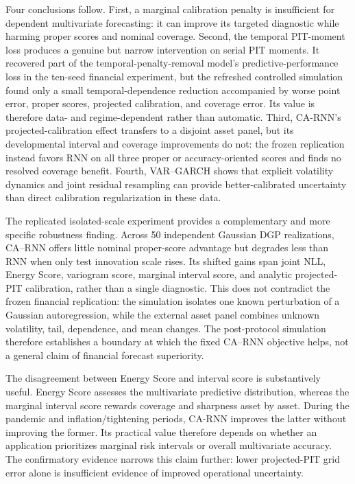 \documentclass[11pt]{article}
\begin{document}
Four conclusions follow. First, a marginal calibration penalty is insufficient
for dependent multivariate forecasting: it can improve its targeted diagnostic
while harming proper scores and nominal coverage. Second, the temporal PIT-moment
loss produces a genuine but narrow intervention on serial PIT moments. It
recovered part of the temporal-penalty-removal model's predictive-performance
loss in the ten-seed financial experiment, but the refreshed controlled
simulation found only a small temporal-dependence reduction accompanied by worse
point error, proper scores, projected calibration, and coverage error. Its value
is therefore data- and regime-dependent rather than automatic. Third, CA-RNN's projected-calibration
effect transfers to a disjoint asset panel, but its developmental interval and
coverage improvements do not: the frozen replication instead favors RNN on all
three proper or accuracy-oriented scores and finds no resolved coverage benefit.
Fourth, VAR--GARCH shows that explicit volatility dynamics and joint residual
resampling can provide better-calibrated uncertainty than direct calibration
regularization in these data.

The replicated isolated-scale experiment provides a complementary and more
specific robustness finding. Across 50 independent Gaussian DGP realizations,
CA--RNN offers little nominal proper-score advantage but degrades less than RNN
when only test innovation scale rises. Its shifted gains span joint NLL, Energy
Score, variogram score, marginal interval score, and analytic projected-PIT
calibration, rather than a single diagnostic. This does not contradict the
frozen financial replication: the simulation isolates one known perturbation
of a Gaussian autoregression, while the external asset panel combines unknown
volatility, tail, dependence, and mean changes. The post-protocol simulation
therefore establishes a boundary at which the fixed CA--RNN objective helps,
not a general claim of financial forecast superiority.

The disagreement between Energy Score and interval score is substantively useful.
Energy Score assesses the multivariate predictive distribution, whereas the
marginal interval score rewards coverage and sharpness asset by asset. During the
pandemic and inflation/tightening periods, CA-RNN improves the latter
without improving the former. Its practical value therefore depends on whether an
application prioritizes marginal risk intervals or overall multivariate accuracy.
The confirmatory evidence narrows this claim further: lower projected-PIT grid
error alone is insufficient evidence of improved operational uncertainty.
\end{document}
